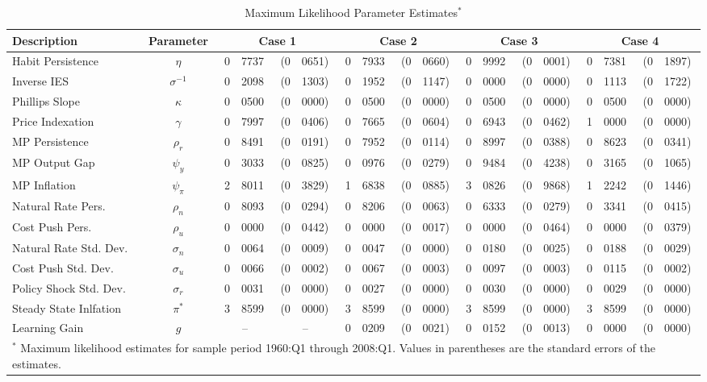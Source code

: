 \begin{sidewaystable}
\begin{small}
\begin{center}
\caption{Maximum Likelihood Parameter Estimates${}^{*}$}\label{tb:parms}
\vspace*{1pc}
\begin{tabular}{l|c|r@{.}lr@{.}l|r@{.}lr@{.}l|r@{.}lr@{.}l|r@{.}lr@{.}l} \hline
Description & Parameter & \multicolumn{4}{|c|}{Case 1} & \multicolumn{4}{|c|}{Case 2} & \multicolumn{4}{|c|}{Case 3} & \multicolumn{4}{|c}{Case 4} \\ \hline 
Habit Persistence & $\eta$ & 0&7737 & (0&0651) & 0&7933 & (0&0660) & 0&9992 & (0&0001) & 0&7381 & (0&1897) \\  
Inverse IES & $\sigma^{-1}$ & 0&2098 & (0&1303) & 0&1952 & (0&1147) & 0&0000 & (0&0000) & 0&1113 & (0&1722) \\  
Phillips Slope & $\kappa$ & 0&0500 & (0&0000) & 0&0500 & (0&0000) & 0&0500 & (0&0000) & 0&0500 & (0&0000) \\  
Price Indexation & $\gamma$ & 0&7997 & (0&0406) & 0&7665 & (0&0604) & 0&6943 & (0&0462) & 1&0000 & (0&0000) \\  
MP Persistence & $\rho_r$ & 0&8491 & (0&0191) & 0&7952 & (0&0114) & 0&8997 & (0&0388) & 0&8623 & (0&0341) \\  
MP Output Gap & $\psi_y$ & 0&3033 & (0&0825) & 0&0976 & (0&0279) & 0&9484 & (0&4238) & 0&3165 & (0&1065) \\  
MP Inflation & $\psi_\pi$ & 2&8011 & (0&3829) & 1&6838 & (0&0885) & 3&0826 & (0&9868) & 1&2242 & (0&1446)  \\  
Natural Rate Pers. & $\rho_{n}$ & 0&8093 & (0&0294) & 0&8206 & (0&0063) & 0&6333 & (0&0279) & 0&3341 & (0&0415) \\  
Cost Push Pers. & $\rho_{u}$ & 0&0000 & (0&0442) & 0&0000 & (0&0017) & 0&0000 & (0&0464) & 0&0000 & (0&0379) \\  
Natural Rate Std. Dev. & $\sigma_{n}$ & 0&0064 & (0&0009) & 0&0047 & (0&0000) & 0&0180 & (0&0025) & 0&0188 & (0&0029)  \\  
Cost Push Std. Dev. & $\sigma_{u}$ & 0&0066 & (0&0002) & 0&0067 & (0&0003) & 0&0097 & (0&0003) & 0&0115 & (0&0002) \\  
Policy Shock Std. Dev. & $\sigma_{r}$ & 0&0031 & (0&0000) & 0&0027 & (0&0000) & 0&0030 & (0&0000) & 0&0029 & (0&0000)  \\  
Steady State Inlfation & $\pi^{*}$ & 3&8599 & (0&0000) & 3&8599 & (0&0000) & 3&8599 & (0&0000) & 3&8599 & (0&0000) \\  
Learning Gain & $g$ & \multicolumn{2}{|c}{--} & \multicolumn{2}{c|}{--} & 0&0209 & (0&0021) & 0&0152 & (0&0013) & 0&0000 & (0&0000)  \\ \hline 
\multicolumn{18}{p{7.5in}}{${}^{*}$ Maximum likelihood estimates for sample period 1960:Q1 through 2008:Q1.  Values in parentheses are the standard errors of the estimates.}
\end{tabular}
\end{center}
\end{small}
\end{sidewaystable}
